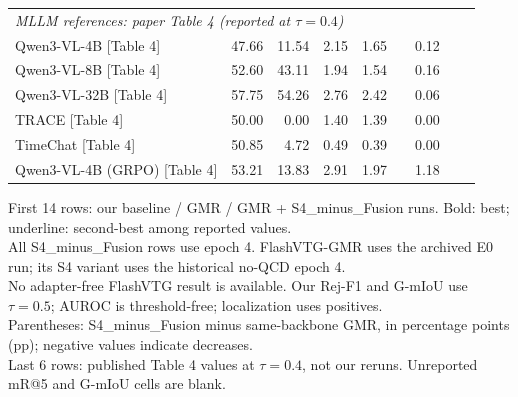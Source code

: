 \documentclass{article}
\begin{document}
\begin{table}[ht]
{\begin{tabular}{lrrrrrrrr}
\midrule
\multicolumn{9}{l}{\textit{MLLM references: paper Table 4 (reported at $\tau=0.4$)}} \\
Qwen3-VL-4B [Table 4] & 47.66 & 11.54 & 2.15 & 1.65 &  & 0.12 &  &  \\
Qwen3-VL-8B [Table 4] & 52.60 & 43.11 & 1.94 & 1.54 &  & 0.16 &  &  \\
Qwen3-VL-32B [Table 4] & 57.75 & 54.26 & 2.76 & 2.42 &  & 0.06 &  &  \\
TRACE [Table 4] & 50.00 & 0.00 & 1.40 & 1.39 &  & 0.00 &  &  \\
TimeChat [Table 4] & 50.85 & 4.72 & 0.49 & 0.39 &  & 0.00 &  &  \\
Qwen3-VL-4B (GRPO) [Table 4] & 53.21 & 13.83 & 2.91 & 1.97 &  & 1.18 &  &  \\
\bottomrule
\end{tabular}}
\par\smallskip\begin{minipage}{\textwidth}\footnotesize
First 14 rows: our baseline / GMR / GMR + S4\_minus\_Fusion runs. Bold: best; underline: second-best among reported values.\\
All S4\_minus\_Fusion rows use epoch 4. FlashVTG-GMR uses the archived E0 run; its S4 variant uses the historical no-QCD epoch 4.\\
No adapter-free FlashVTG result is available. Our Rej-F1 and G-mIoU use $\tau=0.5$; AUROC is threshold-free; localization uses positives.\\
Parentheses: S4\_minus\_Fusion minus same-backbone GMR, in percentage points (pp); negative values indicate decreases.\\
Last 6 rows: published Table 4 values at $\tau=0.4$, not our reruns. Unreported mR@5 and G-mIoU cells are blank.
\end{minipage}
\end{table}
\end{document}
